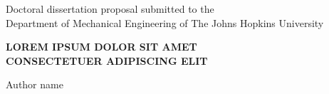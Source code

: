 





\newcommand{\COMMENT}{\textcolor{red}}
\newcommand{\ADDCITATION}{\COMMENT{(ADD CITATION)}}


\newcommand{\say}[2]{\hfill\small\enquote{\textit{#1}}{ - \small\textsc{#2}.}}












\vspace*{0.025in}
\thispagestyle{empty}

\begin{center}
    Doctoral dissertation proposal submitted to the \\
    Department of Mechanical Engineering of The Johns Hopkins University \\
    
    \vspace{0.65in}

    \MakeUppercase{\textbf{LOREM IPSUM DOLOR SIT AMET\\CONSECTETUER ADIPISCING ELIT}}       %
    
    \vspace{0.25in}
    
    Author name   %
\end{center}


